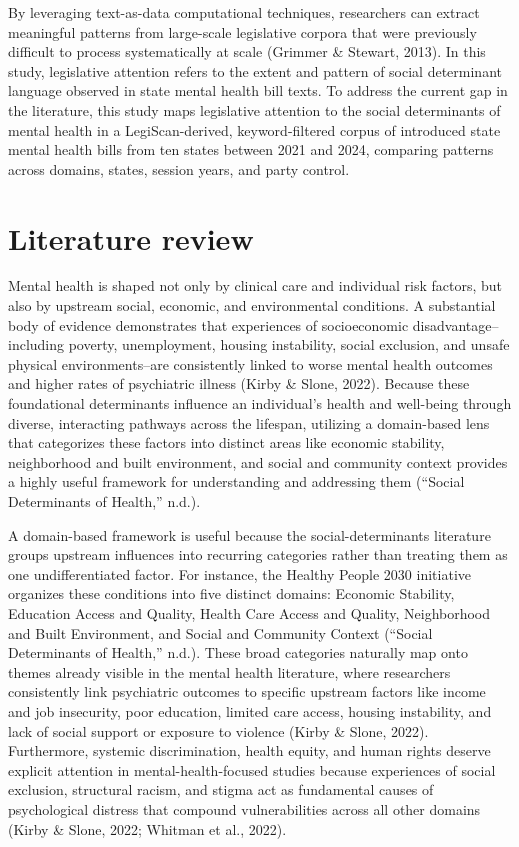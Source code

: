 \documentclass[10pt,twocolumn]{article}
\begin{document}
By leveraging text-as-data computational techniques, researchers can
extract meaningful patterns from large-scale legislative corpora that
were previously difficult to process systematically at scale (Grimmer \&
Stewart, 2013). In this study, legislative attention refers to the
extent and pattern of social determinant language observed in state
mental health bill texts. To address the current gap in the literature,
this study maps legislative attention to the social determinants of
mental health in a LegiScan-derived, keyword-filtered corpus of
introduced state mental health bills from ten states between 2021 and
2024, comparing patterns across domains, states, session years, and
party control.

\section{Literature review}\label{literature-review}

Mental health is shaped not only by clinical care and individual risk
factors, but also by upstream social, economic, and environmental
conditions. A substantial body of evidence demonstrates that experiences
of socioeconomic disadvantage--including poverty, unemployment, housing
instability, social exclusion, and unsafe physical environments--are
consistently linked to worse mental health outcomes and higher rates of
psychiatric illness (Kirby \& Slone, 2022). Because these foundational
determinants influence an individual's health and well-being through
diverse, interacting pathways across the lifespan, utilizing a
domain-based lens that categorizes these factors into distinct areas
like economic stability, neighborhood and built environment, and social
and community context provides a highly useful framework for
understanding and addressing them ({``Social {Determinants} of
{Health},''} n.d.).

A domain-based framework is useful because the social-determinants
literature groups upstream influences into recurring categories rather
than treating them as one undifferentiated factor. For instance, the
Healthy People 2030 initiative organizes these conditions into five
distinct domains: Economic Stability, Education Access and Quality,
Health Care Access and Quality, Neighborhood and Built Environment, and
Social and Community Context ({``Social {Determinants} of {Health},''}
n.d.). These broad categories naturally map onto themes already visible
in the mental health literature, where researchers consistently link
psychiatric outcomes to specific upstream factors like income and job
insecurity, poor education, limited care access, housing instability,
and lack of social support or exposure to violence (Kirby \& Slone,
2022). Furthermore, systemic discrimination, health equity, and human
rights deserve explicit attention in mental-health-focused studies
because experiences of social exclusion, structural racism, and stigma
act as fundamental causes of psychological distress that compound
vulnerabilities across all other domains (Kirby \& Slone, 2022; Whitman
et al., 2022).
\end{document}
